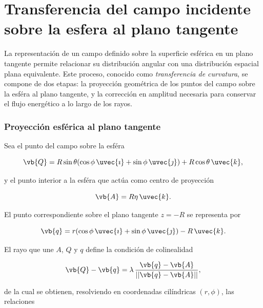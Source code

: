 \chapter{Transferencia del campo incidente sobre la esfera al plano tangente}
\label{sec:transferencia_campo_esfera_plano}

La representación de un campo definido sobre la superficie esférica en un plano tangente permite relacionar su distribución angular con una distribución espacial plana equivalente. Este proceso, conocido como \emph{transferencia de curvatura}, se compone de dos etapas: la proyección geométrica de los puntos del campo sobre la esféra al plano tangente, y la corrección en amplitud necesaria para conservar el flujo energético a lo largo de los rayos.

\subsection{Proyección esférica al plano tangente}
\label{subsec:proyeccion_esfera_plano}

Sea el punto del campo sobre la esféra

\begin{equation}
\vb{Q} = R \sin\theta(\cos\phi\,\uvec{\imath} + \sin\phi\,\uvec{\jmath}) + R\cos\theta\,\uvec{k},
\label{eq:Q_vector}
\end{equation}

y el punto interior a la esféra que actúa como centro de proyección

\begin{equation}
\vb{A} = R\eta\,\uvec{k}.
\label{eq:A_vector}
\end{equation}

El punto correspondiente sobre el plano tangente \(z=-R\) se representa por

\begin{equation}
\vb{q} = r(\cos\phi\,\uvec{\imath} + \sin\phi\,\uvec{\jmath}) - R\,\uvec{k}.
\label{eq:q_vector}
\end{equation}

El rayo que une \(A\), \(Q\) y \(q\) define la condición de colinealidad

\begin{equation}
\vb{Q} - \vb{q} = \lambda \, \frac{\vb{q} - \vb{A}}{||\vb{q} - \vb{A}||},
\label{eq:colinealidad}
\end{equation}

de la cual se obtienen, resolviendo en coordenadas cilíndricas \((r,\phi)\), las relaciones


